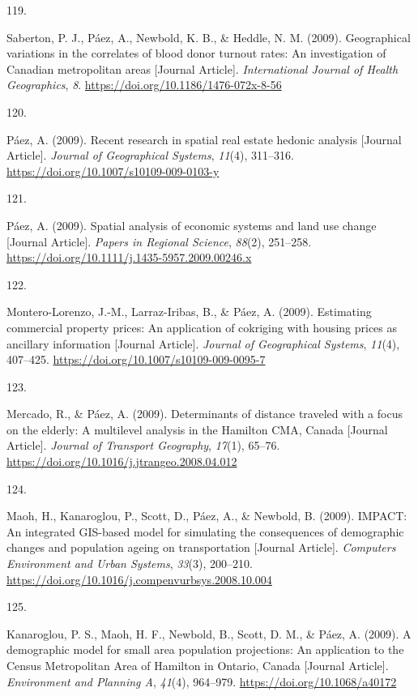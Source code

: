 \documentclass[11pt,a4paper,]{awesome-cv}
\newlength{\cslhangindent}
\newlength{\csllabelwidth}
\newenvironment{CSLReferences}[2] %
 {\begin{list}{}{%
  \setlength{\itemindent}{0pt}
  \setlength{\leftmargin}{0pt}
  \setlength{\parsep}{0pt}
  \ifodd #1
   \setlength{\leftmargin}{\cslhangindent}
   \setlength{\itemindent}{-1\cslhangindent}
  \fi
  \setlength{\itemsep}{#2\baselineskip}}}
 {\end{list}}
\newcommand{\CSLLeftMargin}[1]{\parbox[t]{\csllabelwidth}{\strut#1\strut}}
\newcommand{\CSLRightInline}[1]{\parbox[t]{\linewidth - \csllabelwidth}{\strut#1\strut}}
\begin{document}
\begin{CSLReferences}{0}{0}
\CSLLeftMargin{119. }%
\CSLRightInline{Saberton, P. J., Páez, A., Newbold, K. B., \& Heddle, N.
M. (2009). Geographical variations in the correlates of blood donor
turnout rates: An investigation of Canadian metropolitan areas
{[}Journal Article{]}. \emph{International Journal of Health
Geographics}, \emph{8}. \url{https://doi.org/10.1186/1476-072x-8-56}}

\CSLLeftMargin{120. }%
\CSLRightInline{Páez, A. (2009). Recent research in spatial real estate
hedonic analysis {[}Journal Article{]}. \emph{Journal of Geographical
Systems}, \emph{11}(4), 311--316.
\url{https://doi.org/10.1007/s10109-009-0103-y}}

\CSLLeftMargin{121. }%
\CSLRightInline{Páez, A. (2009). Spatial analysis of economic systems
and land use change {[}Journal Article{]}. \emph{Papers in Regional
Science}, \emph{88}(2), 251--258.
\url{https://doi.org/10.1111/j.1435-5957.2009.00246.x}}

\CSLLeftMargin{122. }%
\CSLRightInline{Montero-Lorenzo, J.-M., Larraz-Iribas, B., \& Páez, A.
(2009). Estimating commercial property prices: An application of
cokriging with housing prices as ancillary information {[}Journal
Article{]}. \emph{Journal of Geographical Systems}, \emph{11}(4),
407--425. \url{https://doi.org/10.1007/s10109-009-0095-7}}

\CSLLeftMargin{123. }%
\CSLRightInline{Mercado, R., \& Páez, A. (2009). Determinants of
distance traveled with a focus on the elderly: A multilevel analysis in
the Hamilton CMA, Canada {[}Journal Article{]}. \emph{Journal of
Transport Geography}, \emph{17}(1), 65--76.
\url{https://doi.org/10.1016/j.jtrangeo.2008.04.012}}

\CSLLeftMargin{124. }%
\CSLRightInline{Maoh, H., Kanaroglou, P., Scott, D., Páez, A., \&
Newbold, B. (2009). IMPACT: An integrated GIS-based model for simulating
the consequences of demographic changes and population ageing on
transportation {[}Journal Article{]}. \emph{Computers Environment and
Urban Systems}, \emph{33}(3), 200--210.
\url{https://doi.org/10.1016/j.compenvurbsys.2008.10.004}}

\CSLLeftMargin{125. }%
\CSLRightInline{Kanaroglou, P. S., Maoh, H. F., Newbold, B., Scott, D.
M., \& Páez, A. (2009). A demographic model for small area population
projections: An application to the Census Metropolitan Area of Hamilton
in Ontario, Canada {[}Journal Article{]}. \emph{Environment and Planning
A}, \emph{41}(4), 964--979. \url{https://doi.org/10.1068/a40172}}


\end{CSLReferences}
\end{document}
